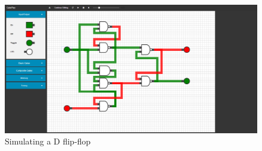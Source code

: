 \begin{figure}[p]
    \centering
    \includegraphics[width=\textheight,angle=90]{dflipflop.png}
    \caption{Simulating a D flip-flop}
    \label{fig:dflopflop}
\end{figure}